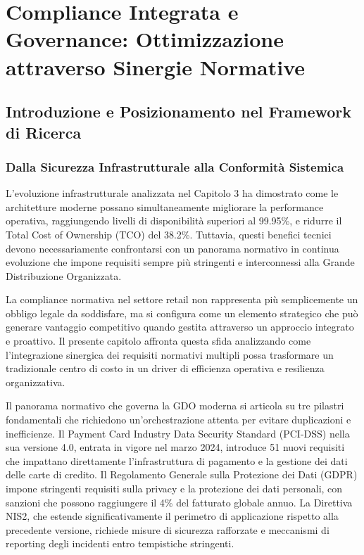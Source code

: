 
\chapter{Compliance Integrata e Governance: Ottimizzazione attraverso Sinergie Normative}

\section{Introduzione e Posizionamento nel Framework di Ricerca}

\subsection{Dalla Sicurezza Infrastrutturale alla Conformità Sistemica}

L'evoluzione infrastrutturale analizzata nel Capitolo 3 ha dimostrato come le architetture moderne possano simultaneamente migliorare la performance operativa, raggiungendo livelli di disponibilità superiori al 99.95\%, e ridurre il Total Cost of Ownership (TCO) del 38.2\%. Tuttavia, questi benefici tecnici devono necessariamente confrontarsi con un panorama normativo in continua evoluzione che impone requisiti sempre più stringenti e interconnessi alla Grande Distribuzione Organizzata.

La compliance normativa nel settore retail non rappresenta più semplicemente un obbligo legale da soddisfare, ma si configura come un elemento strategico che può generare vantaggio competitivo quando gestita attraverso un approccio integrato e proattivo. Il presente capitolo affronta questa sfida analizzando come l'integrazione sinergica dei requisiti normativi multipli possa trasformare un tradizionale centro di costo in un driver di efficienza operativa e resilienza organizzativa.

Il panorama normativo che governa la GDO moderna si articola su tre pilastri fondamentali che richiedono un'orchestrazione attenta per evitare duplicazioni e inefficienze. Il Payment Card Industry Data Security Standard (PCI-DSS) nella sua versione 4.0, entrata in vigore nel marzo 2024, introduce 51 nuovi requisiti che impattano direttamente l'infrastruttura di pagamento e la gestione dei dati delle carte di credito\footnotemark[1]. Il Regolamento Generale sulla Protezione dei Dati (GDPR) impone stringenti requisiti sulla privacy e la protezione dei dati personali, con sanzioni che possono raggiungere il 4\% del fatturato globale annuo. La Direttiva NIS2, che estende significativamente il perimetro di applicazione rispetto alla precedente versione, richiede misure di sicurezza rafforzate e meccanismi di reporting degli incidenti entro tempistiche stringenti.

